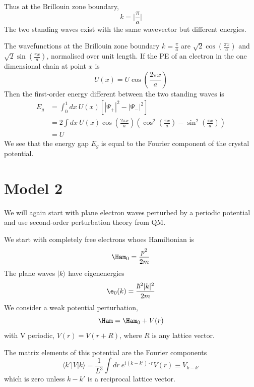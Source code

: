 \documentclass[a4paper, 11pt, normalem]{report}
\begin{document}
Thus at the Brillouin zone boundary, 
\begin{equation}
    k = \big|\frac{\pi}{a}\big|
\end{equation}
The two standing waves exist with the same wavevector but different energies.

The wavefunctions at the Brillouin zone boundary $k=\frac{\pi}{a}$ are $\sqrt{2}\cos(\frac{\pi x}{a})$ and $\sqrt{2}\sin(\frac{\pi x}{a})$, normalised over unit length. 
If the PE of an electron in the one dimensional chain at point $x$ is
\begin{equation}
    U(x) = U\cos\left(\frac{2\pi x}{a}\right)
\end{equation}
Then the first-order energy different between the two standing waves is
\begin{align}
    E_g &= \int_0^1 dx ~ U(x) \left[|\Psi_+|^2 - |\Psi_-|^2\right] \\
        &= 2\int dx ~ U(x) \cos\left(\frac{2\pi x}{a}\right)\left(\cos^2\left(\frac{\pi x}{a}\right) - \sin^2\left(\frac{\pi x}{a}\right) \right) \\
        &= U
\end{align}
We see that the energy gap $E_g$ is equal to the Fourier component of the crystal potential.

\section{Model 2}
We will again start with plane electron waves perturbed by a periodic potential and use second-order perturbation theory from QM.

We start with completely free electrons whoes Hamiltonian is 
\begin{equation}
    \Ham_0 = \frac{p^2}{2m}
\end{equation}
The plane waves $|k\rangle$ have eigenenergies
\begin{equation}
    \e_0(k) = \frac{\hbar^2|k|^2}{2m}
\end{equation}
We consider a weak potential perturbation, 
\begin{equation}
    \Ham = \Ham_0 + V(r)
\end{equation}
with V periodic, $V(r) = V(r+R)$, where $R$ is any lattice vector.

The matrix elements of this potential are the Fourier components
\begin{equation}
    \langle k'|V|k\rangle = \frac{1}{L^3} \int dr~ e^{i(k-k')\cdot r} V(r) \equiv V_{k-k'}
\end{equation}
which is zero unless $k-k'$ is a reciprocal lattice vector. 
\end{document}
